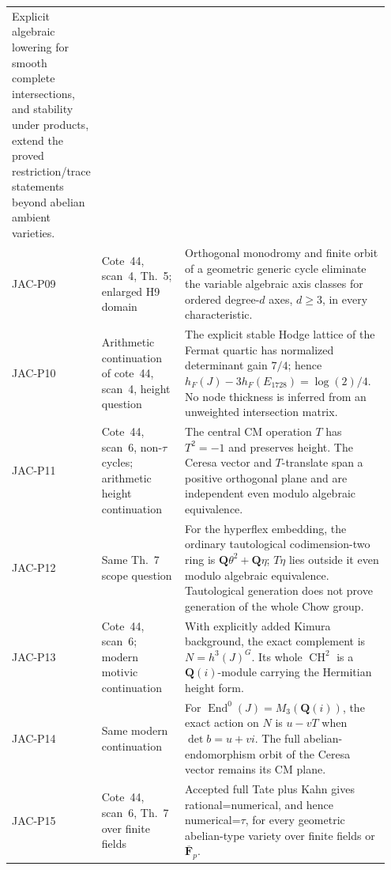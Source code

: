 \begin{longtable}{@{}p{0.12\linewidth}p{0.25\linewidth}p{0.58\linewidth}@{}}
Explicit algebraic lowering for smooth complete intersections,
and stability under products, extend the proved restriction/trace
statements beyond abelian ambient varieties.\\
JAC-P09 & Cote~44, scan~4, Th.~5; enlarged H9 domain &
Orthogonal monodromy and finite orbit of a geometric generic
cycle eliminate the variable algebraic axis classes for ordered
degree-$d$ axes, $d\ge3$, in every characteristic.\\
JAC-P10 & Arithmetic continuation of cote~44, scan~4, height question &
The explicit stable Hodge lattice of the Fermat quartic has
normalized determinant gain $7/4$; hence
$h_F(J)-3h_F(E_{1728})=\log(2)/4$. No node thickness is inferred
from an unweighted intersection matrix.\\
JAC-P11 & Cote~44, scan~6, non-$\tau$ cycles; arithmetic height continuation &
The central CM operation $T$ has $T^2=-1$ and preserves height.
The Ceresa vector and $T$-translate span a positive orthogonal
plane and are independent even modulo algebraic equivalence.\\
JAC-P12 & Same Th.~7 scope question &
For the hyperflex embedding, the ordinary tautological
codimension-two ring is $\mathbf Q\theta^2+\mathbf Q\eta$;
$T\eta$ lies outside it even modulo algebraic equivalence.
Tautological generation does not prove generation of the whole Chow group.\\
JAC-P13 & Cote~44, scan~6; modern motivic continuation &
With explicitly added Kimura background, the exact complement is
$N=h^3(J)^G$. Its whole $\operatorname{CH}^2$ is a
$\mathbf Q(i)$-module carrying the Hermitian height form.\\
JAC-P14 & Same modern continuation &
For $\operatorname{End}^0(J)=M_3(\mathbf Q(i))$, the exact action
on $N$ is $u-vT$ when $\det b=u+vi$. The full abelian-endomorphism
orbit of the Ceresa vector remains its CM plane.\\
JAC-P15 & Cote~44, scan~6, Th.~7 over finite fields &
Accepted full Tate plus Kahn gives rational=numerical, and hence
numerical=$\tau$, for every geometric abelian-type variety over
finite fields or $\overline{\mathbf F}_p$.\\
\bottomrule
\end{longtable}
\endgroup

